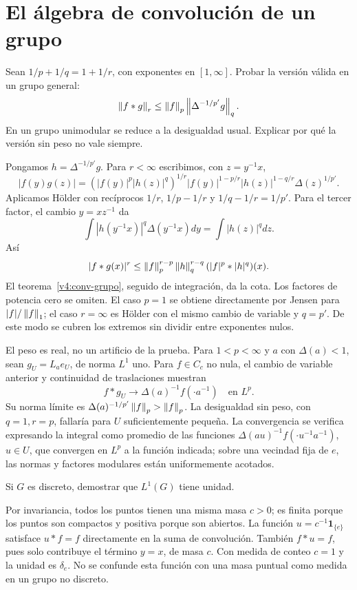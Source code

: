 \chapter{El álgebra de convolución de un grupo}

\begin{ejercicio}\label{ej:v4-l22-1}
Sean $1/p+1/q=1+1/r$, con exponentes en $[1,\infty]$. Probar la versión válida en un grupo general:
\[
 \left\lVert f*g\right\rVert_r\leq\left\lVert f\right\rVert_p\left\lVert\Delta^{-1/p'}g\right\rVert_q.
\]
En un grupo unimodular se reduce a la desigualdad usual. Explicar por qué la versión sin peso no vale siempre.
\end{ejercicio}
\begin{solucion}
Pongamos $h=\Delta^{-1/p'}g$. Para $r<\infty$ escribimos, con $z=y^{-1}x$,
\[
 |f(y)g(z)|=(|f(y)|^p|h(z)|^q)^{1/r}
 |f(y)|^{1-p/r}|h(z)|^{1-q/r}\Delta(z)^{1/p'}.
\]
Aplicamos Hölder con recíprocos $1/r$, $1/p-1/r$ y $1/q-1/r=1/p'$. Para el tercer factor, el cambio $y=xz^{-1}$ da
\[
 \int |h(y^{-1}x)|^q\Delta(y^{-1}x)dy=\int|h(z)|^qdz.
\]
Así
\[
 |f*g(x)|^r\leq\left\lVert f\right\rVert_p^{r-p}\left\lVert h\right\rVert_q^{r-q}(|f|^p*|h|^q)(x).
\]
El teorema~\ref{v4:conv-grupo}, seguido de integración, da la cota. Los factores de potencia cero se omiten. El caso $p=1$ se obtiene directamente por Jensen para $|f|/\left\lVert f\right\rVert_1$; el caso $r=\infty$ es Hölder con el mismo cambio de variable y $q=p'$. De este modo se cubren los extremos sin dividir entre exponentes nulos.

El peso es real, no un artificio de la prueba. Para $1<p<\infty$ y $a$ con $\Delta(a)<1$, sean $g_U=L_ae_U$, de norma $L^1$ uno. Para $f\in C_c$ no nula, el cambio de variable anterior y continuidad de traslaciones muestran
\[
 f*g_U\longrightarrow\Delta(a)^{-1}f(\cdot a^{-1})\quad\text{en }L^p.
\]
Su norma límite es $\Delta(a)^{-1/p'}\left\lVert f\right\rVert_p>\left\lVert f\right\rVert_p$. La desigualdad sin peso, con $q=1,r=p$, fallaría para $U$ suficientemente pequeña. La convergencia se verifica expresando la integral como promedio de las funciones $\Delta(au)^{-1}f(\cdot u^{-1}a^{-1})$, $u\in U$, que convergen en $L^p$ a la función indicada; sobre una vecindad fija de $e$, las normas y factores modulares están uniformemente acotados.
\end{solucion}

\begin{ejercicio}\label{ej:v4-l22-2}
Si $G$ es discreto, demostrar que $L^1(G)$ tiene unidad.
\end{ejercicio}
\begin{solucion}
Por invariancia, todos los puntos tienen una misma masa $c>0$; es finita porque los puntos son compactos y positiva porque son abiertos. La función $u=c^{-1}\mathbf1_{\{e\}}$ satisface $u*f=f$ directamente en la suma de convolución. También $f*u=f$, pues solo contribuye el término $y=x$, de masa $c$. Con medida de conteo $c=1$ y la unidad es $\delta_e$. No se confunde esta función con una masa puntual como medida en un grupo no discreto.
\end{solucion}

